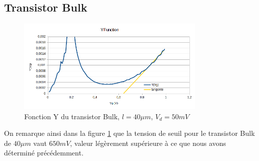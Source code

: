 \documentclass[a4paper,11pt]{report}
\begin{document}
\subsection{Transistor Bulk}
\begin{figure}[h]
    \begin{center}
        \includegraphics[width=0.8\textwidth]{Images/Bulk40-YFunction}
        \caption{Fonction Y du transistor Bulk, $l=40\mu m$, $V_d = 50mV$}
        \label{yfun_bulk_40}
    \end{center}
\end{figure}

On remarque ainsi dans la figure \ref{yfun_bulk_40} que la tension de seuil pour le transistor Bulk de $40\mu m$ vaut $650mV$, valeur légèrement supérieure à ce que nous avons déterminé précédemment.
\end{document}
